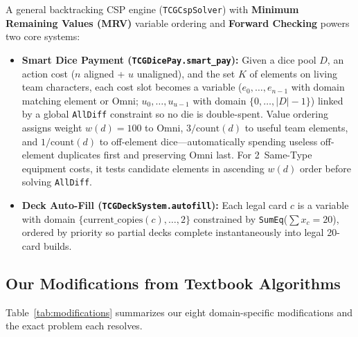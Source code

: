 \documentclass[11pt,a4paper]{article}
\begin{document}
A general backtracking CSP engine (\texttt{TCGCspSolver}) with \textbf{Minimum Remaining Values (MRV)} variable ordering and \textbf{Forward Checking} powers two core systems:
\begin{itemize}[leftmargin=1.4em, itemsep=2pt]
  \item \textbf{Smart Dice Payment (\texttt{TCGDicePay.smart\_pay}):} Given a dice pool $D$, an action cost ($n$ aligned + $u$ unaligned), and the set $K$ of elements on living team characters, each cost slot becomes a variable ($e_0,\dots,e_{n-1}$ with domain matching element or Omni; $u_0,\dots,u_{u-1}$ with domain $\{0,\dots,|D|-1\}$) linked by a global \texttt{AllDiff} constraint so no die is double-spent. Value ordering assigns weight $w(d) = 100$ to Omni, $3/\text{count}(d)$ to useful team elements, and $1/\text{count}(d)$ to off-element dice—automatically spending useless off-element duplicates first and preserving Omni last. For 2~Same-Type equipment costs, it tests candidate elements in ascending $w(d)$ order before solving \texttt{AllDiff}.
  \item \textbf{Deck Auto-Fill (\texttt{TCGDeckSystem.autofill}):} Each legal card $c$ is a variable with domain $\{\text{current\_copies}(c), \dots, 2\}$ constrained by \texttt{SumEq}($\sum x_c = 20$), ordered by priority so partial decks complete instantaneously into legal 20-card builds.
\end{itemize}

\subsection{Our Modifications from Textbook Algorithms}

Table~\ref{tab:modifications} summarizes our eight domain-specific modifications and the exact problem each resolves.
\end{document}

